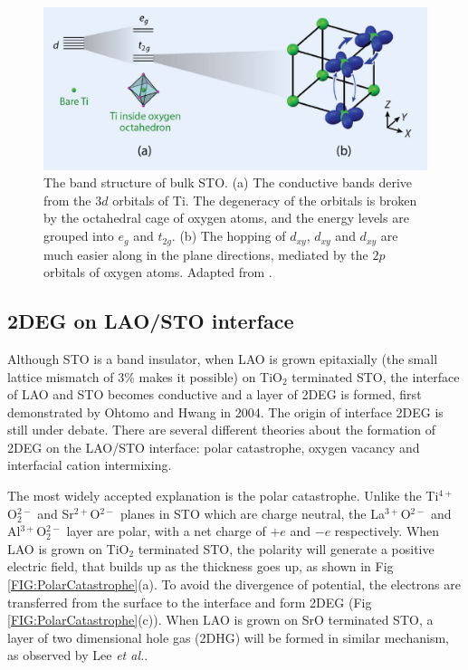 \documentclass[pdflatex, sectionletters, 12pt]{pittetd}    %
\begin{document}
\begin{figure}[h!]
	\centering
	\includegraphics[width=.90\textwidth]{Drawing/STOBand.pdf}
	\caption{The band structure of bulk STO. (a) The conductive bands derive from the $3d$ orbitals of Ti. The degeneracy of the orbitals is broken by the octahedral cage of oxygen atoms, and the energy levels are grouped into $e_g$ and $t_{2g}$. (b) The hopping of $d_{xy}$, $d_{xy}$ and $d_{xy}$ are much easier along in the plane directions, mediated by the $2p$ orbitals of oxygen atoms. Adapted from \cite{sulpizio2014nanoscale}.}
	\label{FIG:STOBand}
\end{figure}

\subsection{2DEG on LAO/STO interface}

Although STO is a band insulator, when LAO is grown epitaxially (the small lattice mismatch of 3\% makes it possible) on TiO$_2$ terminated STO, the interface of LAO and STO becomes conductive and a layer of 2DEG is formed, first demonstrated by Ohtomo and Hwang in 2004\cite{ohtomo2004high}. The origin of interface 2DEG is still under debate. There are several different theories about the formation of 2DEG on the LAO/STO interface: polar catastrophe\cite{nakagawa2006some}, oxygen vacancy\cite{kalabukhov2007effect} and interfacial cation intermixing\cite{willmott2007structural}. 

The most widely accepted explanation is the polar catastrophe. Unlike the Ti$^{4+}$O$_2^{2-}$ and Sr$^{2+}$O$^{2-}$ planes in STO which are charge neutral, the La$^{3+}$O$^{2-}$ and Al$^{3+}$O$_2^{2-}$ layer are polar, with a net charge of $+e$ and $-e$ respectively. When LAO is grown on TiO$_2$ terminated STO, the polarity will generate a positive electric field, that builds up as the thickness goes up, as shown in Fig \ref{FIG:PolarCatastrophe}(a). To avoid the divergence of potential, the electrons are transferred from the surface to the interface and form 2DEG (Fig \ref{FIG:PolarCatastrophe}(c)). When LAO is grown on SrO terminated STO, a layer of two dimensional hole gas (2DHG) will be formed in similar mechanism, as observed by Lee \textit{et al.}\cite{lee2018direct}.
\\
\end{document}

